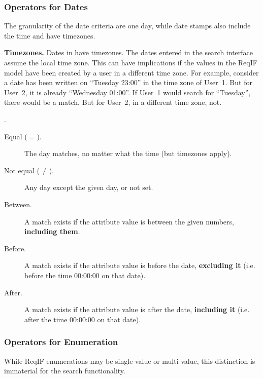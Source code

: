 {{{%
\subsubsection{Operators for Dates}

The granularity of the date criteria are one day, while \pror{} date stamps also include the time and have timezones.

\begin{warning}
\textbf{Timezones.} Dates in \pror{} have timezones.  The dates entered in the search interface assume the local time zone.  This can have implications if the values in the ReqIF model have been created by a user in a different time zone.  For example, consider a date has been written on ``Tuesday 23:00'' in the time zone of User~1.  But for User~2, it is already ``Wednesday 01:00''.  If User~1 would search for ``Tuesday'', there would be a match.  But for User~2, in a different time zone, not.
\end{warning}.

\begin{description}
\item[Equal ($=$).] The day matches, no matter what the time (but timezones apply).
\item[Not equal ($\neq$).] Any day except the given day, or not set.
\item[Between.] A match exists if the attribute value is between the given numbers, \textbf{including them}.
\item[Before.] A match exists if the attribute value is before the date, \textbf{excluding it} (i.e. before the time 00:00:00 on that date).
\item[After.] A match exists if the attribute value is after the date, \textbf{including it} (i.e. after the time 00:00:00 on that date).
\end{description}

\subsubsection{Operators for Enumeration}

While ReqIF enumerations may be single value or multi value, this distinction is immaterial for the search functionality.

}}}
